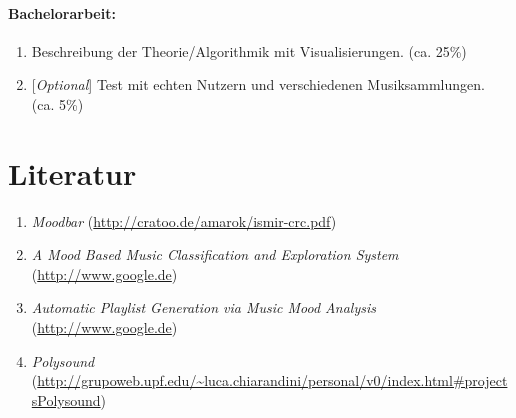 \documentclass[8pt,a4paper,ngerman]{scrartcl}
\begin{document}
    \paragraph{Bachelorarbeit:}
        \begin{enumerate} 
            \item Beschreibung der Theorie/Algorithmik mit Visualisierungen.  (ca. 25\%)
            \item {[}\emph{Optional}{]} Test mit echten Nutzern und verschiedenen
                Musiksammlungen. (ca. 5\%)
        \end{enumerate}

\section{Literatur}
    \begin{enumerate}
        \item \textit{Moodbar} (\url{http://cratoo.de/amarok/ismir-crc.pdf}) \label{label_moodbar}
        \item \textit{A Mood Based Music Classification and Exploration System} (\url{http://www.google.de})
        \item \textit{Automatic Playlist Generation via Music Mood Analysis} (\url{http://www.google.de})
        \item \textit{Polysound} (\url{http://grupoweb.upf.edu/~luca.chiarandini/personal/v0/index.html#projectsPolysound})
    \end{enumerate}
\newpage
\begin{figure}[p]
    \vspace*{+1.0cm}
    \hspace*{-3.0cm}
\end{figure}
\end{document}
